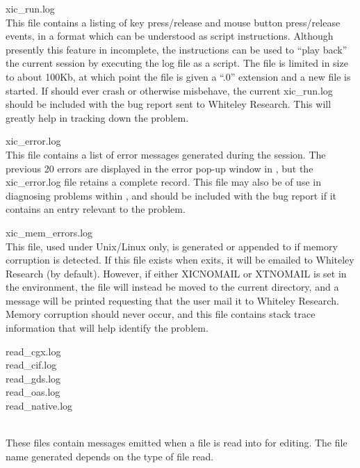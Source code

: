 \begin{description}
\item{\vt xic\_run.log}\\
This file contains a listing of key press/release and mouse button
press/release events, in a format which can be understood as script
instructions.  Although presently this feature in incomplete, the
instructions can be used to ``play back'' the current session by
executing the log file as a script.  The file is limited in size to
about 100Kb, at which point the file is given a ``{\vt .0}'' extension
and a new file is started.  If {\Xic} should ever crash or otherwise
misbehave, the current {\vt xic\_run.log} should be included with the
bug report sent to Whiteley Research.  This will greatly help in
tracking down the problem.
    
\item{\vt xic\_error.log}\\
This file contains a list of error messages generated during the
session.  The previous 20 errors are displayed in the error pop-up
window in {\Xic}, but the {\vt xic\_error.log} file retains a complete
record.  This file may also be of use in diagnosing problems within
{\Xic}, and should be included with the bug report if it contains an
entry relevant to the problem.

\item{\vt xic\_mem\_errors.log}\\
This file, used under Unix/Linux only, is generated or appended to if
memory corruption is detected.  If this file exists when {\Xic} exits,
it will be emailed to Whiteley Research (by default).  However, if
either {\et XICNOMAIL} or {\et XTNOMAIL} is set in the environment,
the file will instead be moved to the current directory, and a message
will be printed requesting that the user mail it to Whiteley Research. 
Memory corruption should never occur, and this file contains stack
trace information that will help identify the problem.

\item\parbox[b]{4in}{\vt
read\_cgx.log\\
read\_cif.log\\
read\_gds.log\\
read\_oas.log\\
read\_native.log}\\
These files contain messages emitted when a file is read into {\Xic}
for editing.  The file name generated depends on the type of file read.


\end{description}
